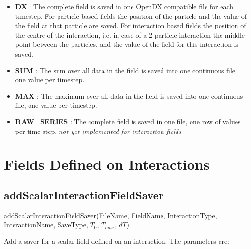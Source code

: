 \documentclass{report}
\begin{document}
\begin{itemize}
\item \textbf{DX} : The complete field is saved in one OpenDX compatible file for each timestep. For particle based fields  the position of the particle and the value of the field at that particle are saved. For interaction based fields the position of the centre of the interaction, i.e. in case of a 2-particle interaction the middle point between the particles, and the value of the field for this interaction is saved.
\item \textbf{SUM} : The sum over all data in the field is saved into one continuous file, one value per timestep.
\item \textbf{MAX} : The maximum over all data in the field is saved into one continuous file, one value per timestep. 
\item \textbf{RAW\_SERIES} : The complete field is saved in one file, one row of values per time step. \textit{not yet implemented for interaction fields} 
\end{itemize}

\section{Fields Defined on Interactions} 

\subsection{addScalarInteractionFieldSaver}
\textsf{addScalarInteractionFieldSaver(FileName, FieldName, InteractionType, InteractionName, SaveType, $T_0$, $T_{max}$, $dT$)}
\par \medskip
Add a saver for a scalar field defined on an interaction. The parameters are:
\end{document}
